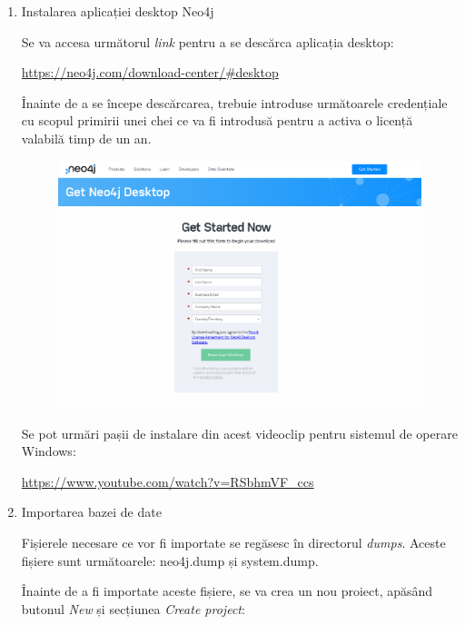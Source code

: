 \documentclass[12pt,a4paper]{report}
\begin{document}
\begin{enumerate}
  \item Instalarea aplicației desktop Neo4j
  
  Se va accesa următorul \emph{link} pentru a se descărca aplicația desktop: 
  
  \url{https://neo4j.com/download-center/#desktop}
  
  Înainte de a se începe descărcarea, trebuie introduse următoarele credențiale cu scopul primirii unei chei ce va fi introdusă pentru a activa o licență valabilă timp de un an.
  
  \begin{figure}[H]
\centering
\caption{}
\begin{adjustbox}{max size={\textwidth}{\textheight}}
\includegraphics[scale=1]{exemplu_41_neo4j_credentiale}
\end{adjustbox}
\caption*{}
\end{figure}

   
  Se pot urmări pașii de instalare din acest videoclip pentru sistemul de operare Windows:
  
  \url{https://www.youtube.com/watch?v=RSbhmVF_ccs}
  
  
  \item Importarea bazei de date
  
  Fișierele necesare ce vor fi importate se regăsesc în directorul \emph{dumps}. Aceste fișiere sunt următoarele: neo4j.dump și system.dump.
  
  Înainte de a fi importate aceste fișiere, se va crea un nou proiect, apăsând butonul \emph{New} și secțiunea \emph{Create project}:
  

\end{enumerate}
\end{document}
